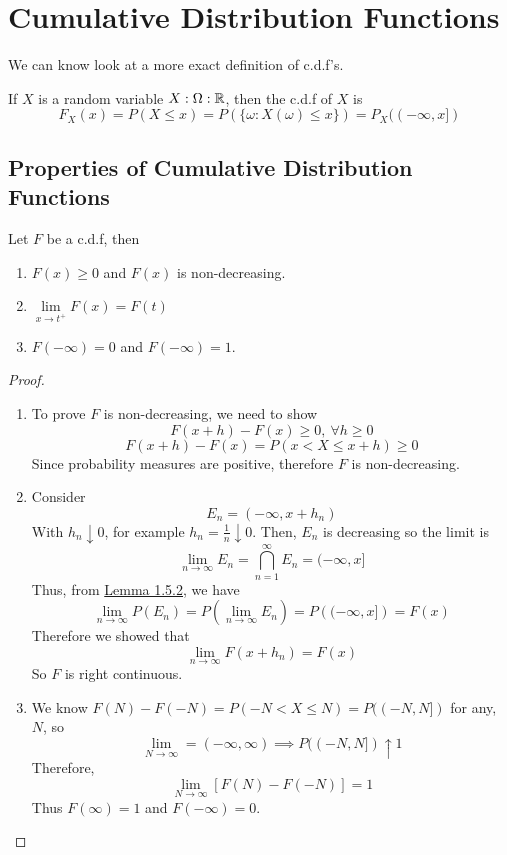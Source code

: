 \documentclass[openany]{report}
\begin{document}
\section{Cumulative Distribution Functions}
We can know look at a more exact definition of c.d.f's. 
\begin{definition}
    If $X$ is a random variable $X: \Omega: \mathbb{R}$, then the c.d.f of $X$ is
    \[F_X(x) = P(X \leq x) = P(\{\omega: X(\omega) \leq x\}) = P_X((-\infty, x])\] 
\end{definition}
\subsection{Properties of Cumulative Distribution Functions}
\begin{theorem}
    
    Let $F$ be a c.d.f, then
    \begin{enumerate}[label=(\roman*)]
        \item $F(x) \geq 0$ and $F(x)$ is non-decreasing.
        \item $\lim\limits_{x\rightarrow t^+}F(x) = F(t)$
        \item $F(-\infty) = 0$ and $F(-\infty)= 1$.
    \end{enumerate}
\end{theorem}
\begin{proof}
    \begin{enumerate}[label=(\roman*)]
        \item  To prove $F$ is non-decreasing, we need to show 
        \[F(x + h) - F(x) \geq 0, \ \forall h \geq 0\]
        \[F(x + h) - F(x) = P(x < X \leq x+h) \geq 0\]
        Since probability measures are positive, therefore $F$ is non-decreasing.
        \item Consider 
        \[E_n = (-\infty, x + h_n)\]
        With $h_n \downarrow 0$, for example $h_n = \frac{1}{n} \downarrow 0$.  Then, $E_n$ is decreasing so the limit is 
        \[\lim_{n\rightarrow \infty} E_n = \bigcap_{n=1}^\infty E_n = (-\infty, x]\]
        Thus, from \hyperref[lem:1.5.2]{Lemma 1.5.2}, we have
        \[\lim_{n\rightarrow \infty} P(E_n) = P\left(\lim_{n\rightarrow\infty} E_n\right) = P\left((-\infty, x]\right) = F(x)\]
        Therefore we showed that 
        \[\lim_{n\rightarrow\infty} F(x + h_n) = F(x)\]
        So $F$ is right continuous.
        \item We know $F(N) - F(-N) = P(-N < X \leq N) = P((-N,N])$ for any, $N$, so 
        \[\lim_{N \rightarrow \infty} = (-\infty,\infty) \implies P((-N,N])\uparrow 1\]
        Therefore,
        \[\lim_{N\rightarrow \infty} [F(N) - F(-N)] = 1 \]
        Thus $F(\infty) = 1$ and $F(-\infty) = 0$.
    \end{enumerate}
\end{proof}
\end{document}
